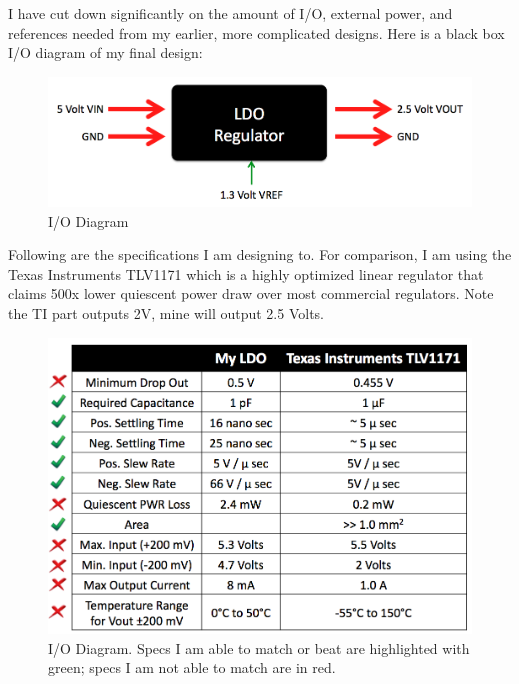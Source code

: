 \documentclass[10pt]{amsart}
\begin{document}
I have cut down significantly on the amount of I/O, external power, and references needed from my earlier, more complicated designs. Here is a black box I/O diagram of my final design: 

\begin{figure}[h]
	\begin{center}
		\includegraphics[width=6in]{Media/black.png}
	\end{center}
	\caption{I/O Diagram}
	\label{fig:black}
\end{figure}

Following are the specifications I am designing to. For comparison, I am using the Texas Instruments TLV1171 which is a highly optimized linear regulator that claims 500x lower quiescent power draw over most commercial regulators. Note the TI part outputs 2V, mine will output 2.5 Volts.

\begin{figure}[h]
	\begin{center}
		\includegraphics[width=6in]{Media/specs.png}
	\end{center}
	\caption{I/O Diagram. Specs I am able to match or beat are highlighted with green; specs I am not able to match are in red.}
	\label{fig:specs}
\end{figure}
\end{document}
